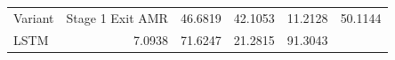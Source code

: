 \begin{tabular}{lrrrr}
\toprule
Variant & Stage 1 Exit %
\midrule
AMR & 46.6819 & 42.1053 & 11.2128 & 50.1144 \\
LSTM & 7.0938 & 71.6247 & 21.2815 & 91.3043 \\
\bottomrule
\end{tabular}
